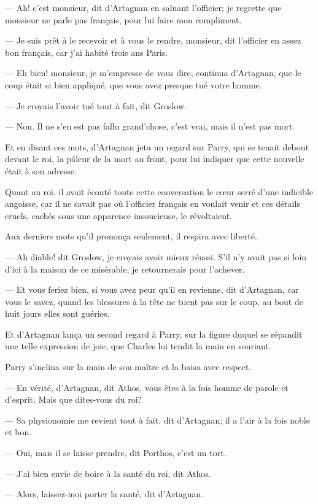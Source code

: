 — Ah! c'est monsieur, dit d'Artagnan en saluant l'officier; je regrette que monsieur ne parle pas français, pour lui faire mon compliment.

— Je suis prêt à le recevoir et à vous le rendre, monsieur, dit l'officier en assez bon français, car j'ai habité trois ans Paris.

— Eh bien! monsieur, je m'empresse de vous dire, continua d'Artagnan, que le coup était si bien appliqué, que vous avez presque tué votre homme.

— Je croyais l'avoir tué tout à fait, dit Groslow.

— Non. Il ne s'en est pas fallu grand'chose, c'est vrai, mais il n'est pas mort.

Et en disant ces mots, d'Artagnan jeta un regard sur Parry, qui se tenait debout devant le roi, la pâleur de la mort au front, pour lui indiquer que cette nouvelle était à son adresse.

Quant au roi, il avait écouté toute cette conversation le cœur serré d'une indicible angoisse, car il ne savait pas où l'officier français en voulait venir et ces détails cruels, cachés sous une apparence insoucieuse, le révoltaient.

Aux derniers mots qu'il prononça seulement, il respira avec liberté.

— Ah diable! dit Groslow, je croyais avoir mieux réussi. S'il n'y avait pas si loin d'ici à la maison de ce misérable, je retournerais pour l'achever.

— Et vous feriez bien, si vous avez peur qu'il en revienne, dit d'Artagnan, car vous le savez, quand les blessures à la tête ne tuent pas sur le coup, au bout de huit jours elles sont guéries.

Et d'Artagnan lança un second regard à Parry, sur la figure duquel se répandit une telle expression de joie, que Charles lui tendit la main en souriant.

Parry s'inclina sur la main de son maître et la baisa avec respect.

— En vérité, d'Artagnan, dit Athos, vous êtes à la fois homme de parole et d'esprit. Mais que dites-vous du roi?

— Sa physionomie me revient tout à fait, dit d'Artagnan; il a l'air à la fois noble et bon.

— Oui, mais il se laisse prendre, dit Porthos, c'est un tort.

— J'ai bien envie de boire à la santé du roi, dit Athos.

— Alors, laissez-moi porter la santé, dit d'Artagnan.

